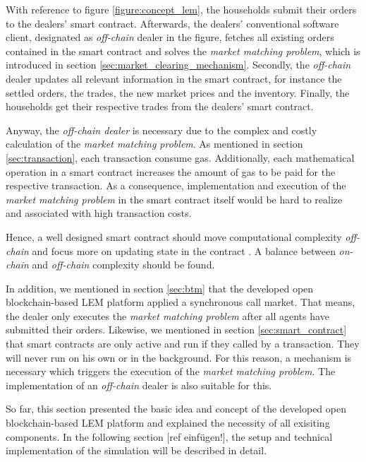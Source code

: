 With reference to figure \ref{figure:concept_lem}, the households submit their orders to the dealers' smart contract.  
Afterwards, the dealers' conventional software client, designated as \textit{off-chain} dealer in the figure, fetches all existing orders contained in the smart contract
and solves the \textit{market matching problem}, which is introduced in section \ref{sec:market_clearing_mechanism}.
Secondly, the \textit{off-chain} dealer updates all relevant information in the smart contract, for instance 
the settled orders, the trades, the new market prices and the inventory.
Finally, the households get their respective trades from the dealers' smart contract. 

Anyway, the \textit{off-chain dealer} is necessary due to the complex and costly calculation of the \textit{market matching problem}. 
As mentioned in section \ref{sec:transaction}, each transaction consume gas. Additionally, each mathematical operation in a smart contract
increases the amount of gas to be paid for the respective transaction. As a consequence, implementation and execution of the \textit{market matching problem}
in the smart contract itself would be hard to realize and associated with high transaction costs. 

Hence, a well designed smart contract should move computational complexity \textit{off-chain} 
and focus more on updating state in the contract . A balance between \textit{on-chain}
and \textit{off-chain} complexity should be found.

In addition, we mentioned in section \ref{sec:btm} that the developed open blockchain-based LEM platform applied a synchronous
call market. That means, the dealer only executes the \textit{market matching problem} after all agents have submitted their orders.
Likewise, we mentioned in section \ref{sec:smart_contract} that smart contracts are only active and run if they called by a transaction.
They will never run on his own or in the background. For this reason, a mechanism is necessary which triggers the execution of the 
\textit{market matching problem}. The implementation of an \textit{off-chain} dealer is also suitable for this.

So far, this section presented the basic idea and concept of the developed open blockchain-based LEM platform
and explained the necessity of all exisiting components. In the following section [ref einfügen!], the setup 
and technical implementation of the simulation will be described in detail. 

